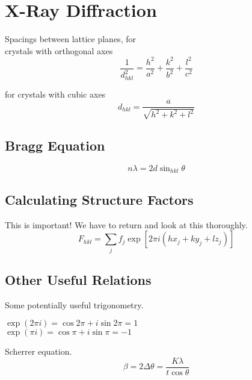 
\section{X-Ray Diffraction}

Spacings between lattice planes, for \\ crystals with orthogonal axes
\begin{equation*}
  \frac{1}{d^2_{hkl}} = \frac{h^2}{a^2} + \frac{k^2}{b^2} + \frac{l^2}{c^2}
\end{equation*}

for crystals with cubic axes
\begin{equation*}
  d_{hkl} = \frac{a}{\sqrt{h^2 + k^2 + l^2}}
\end{equation*}


\subsection*{Bragg Equation}
\begin{equation*}
  n \lambda = 2d \sin_{hkl} \theta
\end{equation*}

\subsection*{Calculating Structure Factors}
This is important! We have to return and look at this thoroughly.
\begin{equation*}
  F_{hkl} = \sum_{j} f_j \exp \left[2 \pi i \left( hx_j + ky_j + lz_j\right)\right]
\end{equation*}

\subsection*{Other Useful Relations}
Some potentially useful trigonometry.
\vspace{\baselineskip}

$\exp{(2 \pi i)} = \cos 2\pi + i \sin 2\pi = 1$ \\
$\exp{(\pi i)} = \cos \pi + i \sin \pi = -1$
\vspace{\baselineskip}

Scherrer equation.
\begin{equation*}
  \beta = 2 \Delta \theta = \frac{K \lambda}{t \cos \theta}
\end{equation*}

